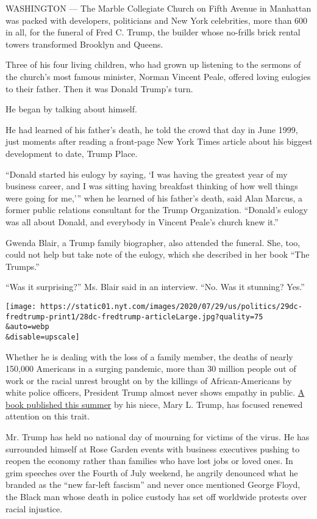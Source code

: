 WASHINGTON --- The Marble Collegiate Church on Fifth Avenue in Manhattan
was packed with developers, politicians and New York celebrities, more
than 600 in all, for the funeral of Fred C. Trump, the builder whose
no-frills brick rental towers transformed Brooklyn and Queens.

Three of his four living children, who had grown up listening to the
sermons of the church's most famous minister, Norman Vincent Peale,
offered loving eulogies to their father. Then it was Donald Trump's
turn.

He began by talking about himself.

He had learned of his father's death, he told the crowd that day in June
1999, just moments after reading a front-page New York Times article
about his biggest development to date, Trump Place.

``Donald started his eulogy by saying, `I was having the greatest year
of my business career, and I was sitting having breakfast thinking of
how well things were going for me,''' when he learned of his father's
death, said Alan Marcus, a former public relations consultant for the
Trump Organization. ``Donald's eulogy was all about Donald, and
everybody in Vincent Peale's church knew it.''

Gwenda Blair, a Trump family biographer, also attended the funeral. She,
too, could not help but take note of the eulogy, which she described in
her book ``The Trumps.''

``Was it surprising?'' Ms. Blair said in an interview. ``No. Was it
stunning? Yes.''

\texttt{[image: https://static01.nyt.com/images/2020/07/29/us/politics/29dc-fredtrump-print1/28dc-fredtrump-articleLarge.jpg?quality=75\\\&auto=webp\\\&disable=upscale]}

Whether he is dealing with the loss of a family member, the deaths of
nearly 150,000 Americans in a surging pandemic, more than 30 million
people out of work or the racial unrest brought on by the killings of
African-Americans by white police officers, President Trump almost never
shows empathy in public.
\href{https://www.nytimes.com/2020/07/07/nyregion/mary-trump-book.html}{A
book published this summer} by his niece, Mary L. Trump, has focused
renewed attention on this trait.

Mr. Trump has held no national day of mourning for victims of the virus.
He has surrounded himself at Rose Garden events with business executives
pushing to reopen the economy rather than families who have lost jobs or
loved ones. In grim speeches over the Fourth of July weekend, he angrily
denounced what he branded as the ``new far-left fascism'' and never once
mentioned George Floyd, the Black man whose death in police custody has
set off worldwide protests over racial injustice.

